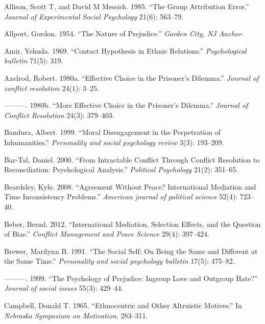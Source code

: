 \documentclass[11pt]{article}
\begin{document}
\hypertarget{refs}{}
\hypertarget{ref-allison1985group}{}
Allison, Scott T, and David M Messick. 1985. ``The Group Attribution
Error.'' \emph{Journal of Experimental Social Psychology} 21(6):
563--79.

\hypertarget{ref-allport1954prejudice}{}
Allport, Gordon. 1954. ``The Nature of Prejudice.'' \emph{Garden City,
NJ Anchor}.

\hypertarget{ref-amir1969contact}{}
Amir, Yehuda. 1969. ``Contact Hypothesis in Ethnic Relations.''
\emph{Psychological bulletin} 71(5): 319.

\hypertarget{ref-axelrod1980effective}{}
Axelrod, Robert. 1980a. ``Effective Choice in the Prisoner's Dilemma.''
\emph{Journal of conflict resolution} 24(1): 3--25.

\hypertarget{ref-axelrod1980more}{}
---------. 1980b. ``More Effective Choice in the Prisoner's Dilemma.''
\emph{Journal of Conflict Resolution} 24(3): 379--403.

\hypertarget{ref-bandura1999moral}{}
Bandura, Albert. 1999. ``Moral Disengagement in the Perpetration of
Inhumanities.'' \emph{Personality and social psychology review} 3(3):
193--209.

\hypertarget{ref-bar2000intractable}{}
Bar-Tal, Daniel. 2000. ``From Intractable Conflict Through Conflict
Resolution to Reconciliation: Psychological Analysis.'' \emph{Political
Psychology} 21(2): 351--65.

\hypertarget{ref-beardsley2008agreement}{}
Beardsley, Kyle. 2008. ``Agreement Without Peace? International
Mediation and Time Inconsistency Problems.'' \emph{American journal of
political science} 52(4): 723--40.

\hypertarget{ref-beber2012international}{}
Beber, Bernd. 2012. ``International Mediation, Selection Effects, and
the Question of Bias.'' \emph{Conflict Management and Peace Science}
29(4): 397--424.

\hypertarget{ref-brewer1991social}{}
Brewer, Marilynn B. 1991. ``The Social Self: On Being the Same and
Different at the Same Time.'' \emph{Personality and social psychology
bulletin} 17(5): 475--82.

\hypertarget{ref-brewer1999ingroupOutgroup}{}
---------. 1999. ``The Psychology of Prejudice: Ingroup Love and
Outgroup Hate?'' \emph{Journal of social issues} 55(3): 429--44.

\hypertarget{ref-campbell1965ethno}{}
Campbell, Donald T. 1965. ``Ethnocentric and Other Altruistic Motives.''
In \emph{Nebraska Symposium on Motivation}, 283--311.
\end{document}
